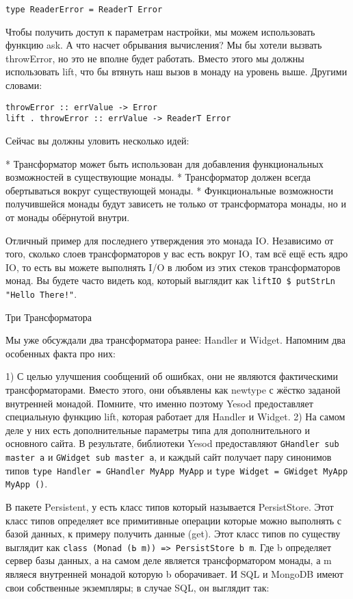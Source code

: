 \begin{lstlisting}
type ReaderError = ReaderT Error
\end{lstlisting}

Чтобы получить доступ к параметрам настройки, мы можем использовать функцию ask. А что насчет обрывания вычисления? Мы бы хотели вызвать throwError, но это не вполне будет работать. Вместо этого мы должны использовать lift, что бы втянуть наш вызов в монаду на уровень выше. Другими словами:

\begin{lstlisting}
throwError :: errValue -> Error
lift . throwError :: errValue -> ReaderT Error
\end{lstlisting}

Сейчас вы должны уловить несколько идей:

* Трансформатор может быть использован для добавления функциональных возможностей в существующие монады.
* Трансформатор должен всегда обертываться вокруг существующей монады.
* Функциональные возможности получившейся монады будут зависеть не только от трансформатора монады, но и от монады обёрнутой внутри.

Отличный пример для последнего утверждения это монада IO. Независимо от того, сколько слоев трансформаторов у вас есть вокруг IO, там всё ещё есть ядро IO, то есть вы можете выполнять I/O в любом из этих стеков трансформаторов монад. Вы будете часто видеть код, который выглядит как \lstinline'liftIO $ putStrLn "Hello There!"'.

Три Трансформатора

Мы уже обсуждали два трансформатора ранее: Handler и Widget. Напомним два особенных факта про них:

1) С целью улучшения сообщений об ошибках, они не являются фактическими трансформаторами. Вместо этого, они объявлены как newtype с жёстко заданой внутренней монадой. Помните, что именно поэтому Yesod предоставляет специальную функцию lift, которая работает для Handler и Widget.
2) На самом деле у них есть дополнительные параметры типа для дополнительного и основного сайта. В результате, библиотеки Yesod предоставляют \lstinline'GHandler sub master a' и \lstinline'GWidget sub master a', и каждый сайт получает пару синонимов типов \lstinline'type Handler = GHandler MyApp MyApp' и \lstinline'type Widget = GWidget MyApp MyApp ()'.

В пакете Persistent, у есть класс типов который называется PersistStore. Этот класс типов определяет все примитивные операции которые можно выполнять с базой данных, к примеру получить данные (get). Этот класс типов по существу выглядит как \lstinline'class (Monad (Ь m)) => PersistStore b m'. Где b определяет сервер базы данных, а на самом деле является трансформатором монады, а m являеся внутренней монадой которую b оборачивает. И SQL и MongoDB имеют свои собственные экземпляры; в случае SQL, он выглядит так:

